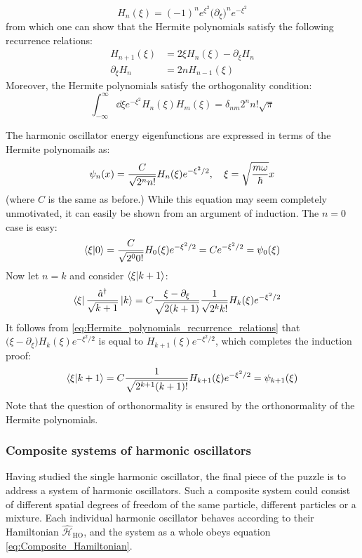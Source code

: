 \documentclass[nofootinbib,reprint,english]{revtex4-1}
\newcommand{\hatHH}{\hat{\mathcal{H}}}
\begin{document}
\begin{equation}\label{eq:Hermite_polynomials_Rodrigues_Formula}
H_n(\xi)=(-1)^ne^{\xi^2}\big(\partial_\xi\big)^ne^{-\xi^2}
\end{equation}
from which one can show that the Hermite polynomials satisfy the following recurrence relations:
\begin{subequations}\label{eq:Hermite_polynomials_recurrence_relations}
\begin{align}
H_{n+1}(\xi)&=2\xi H_n(\xi)-\partial_\xi H_n\\
\partial_\xi H_n&=2nH_{n-1}(\xi)
\end{align}
\end{subequations}
Moreover, the Hermite polynomials satisfy the orthogonality condition:
\begin{equation}\label{eq:Hermite_polynomials_orthogonality}
\int_{-\infty}^{\infty}\dd{\xi}e^{-\xi^2}H_n(\xi)H_m(\xi)=\delta_{nm}2^nn!\sqrt{\pi}
\end{equation}

The harmonic oscillator energy eigenfunctions are expressed in terms of the Hermite polynomails as:
\begin{equation}\label{eq:harmonic_oscillator_energy_eigenfunctions}
\psi_n(x)=\frac{C}{\sqrt{2^nn!}}H_n(\xi)e^{-\xi^2/2}\qcomma\xi=\sqrt{\frac{m\omega}{\hbar}}x
\end{equation}
(where \(C\) is the same as before.) While this equation may seem completely unmotivated, it can easily be shown from an argument of induction. The \(n=0\) case is easy:
\[\braket{\xi}{0}=\frac{C}{\sqrt{2^00!}}H_0(\xi)e^{-\xi^2/2}=Ce^{-\xi^2/2}=\psi_0(\xi)\]
Now let \(n=k\) and consider \(\braket{\xi}{k+1}\):
\begin{align*}
\bra{\xi}\frac{\hat{a}^\dagger}{\sqrt{k+1}}\ket{k}&=C\frac{\xi-\partial_\xi}{\sqrt{2(k+1)}}\frac{1}{\sqrt{2^kk!}}H_k(\xi)e^{-\xi^2/2}
\end{align*}
It follows from \eqref{eq:Hermite_polynomials_recurrence_relations} that \(\big(\xi-\partial_\xi\big)H_k(\xi)e^{-\xi^2/2}\) is equal to \(H_{k+1}(\xi)e^{-\xi^2/2}\), which completes the induction proof:
\[\braket{\xi}{k+1}=C\frac{1}{\sqrt{2^{k+1}(k+1)!}}H_{k+1}(\xi)e^{-\xi^2/2}=\psi_{k+1}(\xi)\]
Note that the question of orthonormality is ensured by the orthonormality of the Hermite polynomials.
\subsubsection{Composite systems of harmonic oscillators}
Having studied the single harmonic oscillator, the final piece of the puzzle is to address a system of harmonic oscillators. Such a composite system could consist of different spatial degrees of freedom of the same particle, different particles or a mixture. Each individual harmonic oscillator behaves according to their Hamiltonian \(\hatHH_\text{HO}\), and the system as a whole obeys equation \eqref{eq:Composite_Hamiltonian}.
\end{document}
